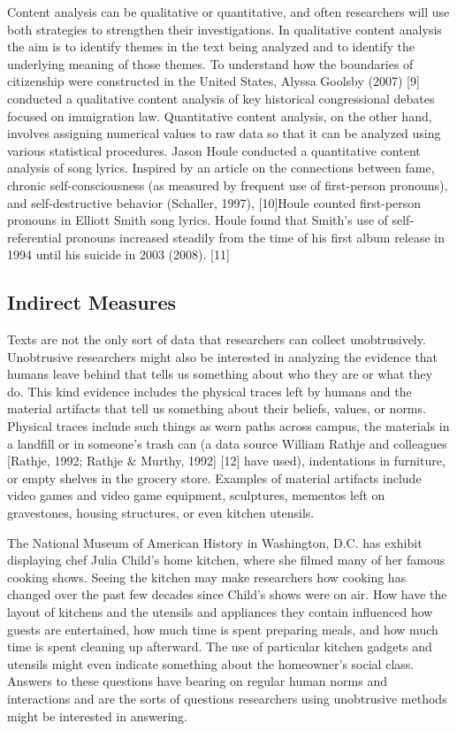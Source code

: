 Content analysis can be qualitative or quantitative, and often researchers will use both strategies to strengthen their investigations. In qualitative content analysis the aim is to identify themes in the text being analyzed and to identify the underlying meaning of those themes. To understand how the boundaries of citizenship were constructed in the United States, Alyssa Goolsby (2007) [9] conducted a qualitative content analysis of key historical congressional debates focused on immigration law. Quantitative content analysis, on the other hand, involves assigning numerical values to raw data so that it can be analyzed using various statistical procedures. Jason Houle conducted a quantitative content analysis of song lyrics. Inspired by an article on the connections between fame, chronic self-consciousness (as measured by frequent use of first-person pronouns), and self-destructive behavior (Schaller, 1997), [10]Houle counted first-person pronouns in Elliott Smith song lyrics. Houle found that Smith’s use of self-referential pronouns increased steadily from the time of his first album release in 1994 until his suicide in 2003 (2008). [11]

\subsection{Indirect Measures}

Texts are not the only sort of data that researchers can collect unobtrusively. Unobtrusive researchers might also be interested in analyzing the evidence that humans leave behind that tells us something about who they are or what they do. This kind evidence includes the physical traces left by humans and the material artifacts that tell us something about their beliefs, values, or norms. Physical traces include such things as worn paths across campus, the materials in a landfill or in someone's trash can (a data source William Rathje and colleagues [Rathje, 1992; Rathje \& Murthy, 1992] [12] have used), indentations in furniture, or empty shelves in the grocery store. Examples of material artifacts include video games and video game equipment, sculptures, mementos left on gravestones, housing structures, or even kitchen utensils.

The National Museum of American History in Washington, D.C. has exhibit displaying chef Julia Child's home kitchen, where she filmed many of her famous cooking shows. Seeing the kitchen may make researchers how cooking has changed over the past few decades since Child's shows were on air. How have the layout of kitchens and the utensils and appliances they contain influenced how guests are entertained, how much time is spent preparing meals, and how much time is spent cleaning up afterward. The use of particular kitchen gadgets and utensils might even indicate something about the homeowner's social class. Answers to these questions have bearing on regular human norms and interactions and are the sorts of questions researchers using unobtrusive methods might be interested in answering.

